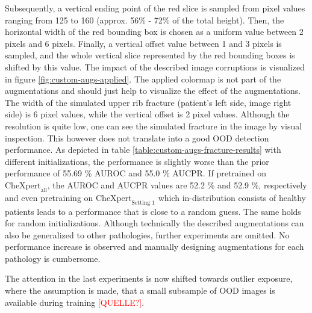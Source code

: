 Subsequently, a vertical ending point of the red slice is sampled from pixel values ranging from 125 to 160 (approx. 56\% - 72\% of the total height).
Then, the horizontal width of the red bounding box is chosen as a uniform value between 2 pixels and 6 pixels.
Finally, a vertical offset value between 1 and 3 pixels is sampled, and the whole vertical slice represented by the red bounding boxes is shifted by this value.
The impact of the described image corruptions is visualized in figure \ref{fig:custom-augs-applied}.
The applied colormap is not part of the augmentations and should just help to visualize the effect of the augmentations.
The width of the simulated upper rib fracture (patient's left side, image right side) is 6 pixel values, while the vertical offset is 2 pixel values.
Although the resolution is quite low, one can see the simulated fracture in the image by visual inspection.
This however does not translate into a good OOD detection performance.
As depicted in table \ref{table:custom-augs-fracture-results} with different initializations, the performance is slightly worse than the prior performance of 55.69 \% AUROC  and 55.0 \% AUCPR.
If pretrained on $\text{CheXpert}_\text{all}$, the AUROC and AUCPR values are 52.2 \% and 52.9 \%, respectively and even pretraining on $\text{CheXpert}_\text{Setting 1}$ which in-distribution consists of healthy patients leads to a performance that is close to a random guess.
The same holds for random initializations.
Although technically the described augmentations can also be generalized to other pathologies, further experiments are omitted.
No performance increase is observed and manually designing augmentations for each pathology is cumbersome.
\par
The attention in the last experiments is now shifted towards outlier exposure, where the assumption is made, that a small subsample of OOD images is available during training \textcolor{red}{[QUELLE?]}.

